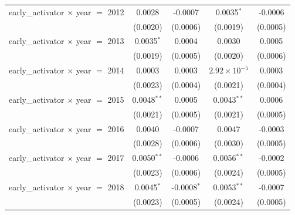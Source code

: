 \begin{tabular}{lcccc}
   early\_activator $\times$ year $=$ 2012              & 0.0028                & -0.0007                   & 0.0035$^{*}$           & -0.0006\\   
                                                        & (0.0020)              & (0.0006)                  & (0.0019)               & (0.0005)\\   
   early\_activator $\times$ year $=$ 2013              & 0.0035$^{*}$          & 0.0004                    & 0.0030                 & 0.0005\\   
                                                        & (0.0019)              & (0.0005)                  & (0.0020)               & (0.0006)\\   
   early\_activator $\times$ year $=$ 2014              & 0.0003                & 0.0003                    & $2.92\times 10^{-5}$   & 0.0003\\   
                                                        & (0.0023)              & (0.0004)                  & (0.0021)               & (0.0004)\\   
   early\_activator $\times$ year $=$ 2015              & 0.0048$^{**}$         & 0.0005                    & 0.0043$^{**}$          & 0.0006\\   
                                                        & (0.0021)              & (0.0005)                  & (0.0021)               & (0.0005)\\   
   early\_activator $\times$ year $=$ 2016              & 0.0040                & -0.0007                   & 0.0047                 & -0.0003\\   
                                                        & (0.0028)              & (0.0006)                  & (0.0030)               & (0.0005)\\   
   early\_activator $\times$ year $=$ 2017              & 0.0050$^{**}$         & -0.0006                   & 0.0056$^{**}$          & -0.0002\\   
                                                        & (0.0023)              & (0.0006)                  & (0.0024)               & (0.0005)\\   
   early\_activator $\times$ year $=$ 2018              & 0.0045$^{*}$          & -0.0008$^{*}$             & 0.0053$^{**}$          & -0.0007\\   
                                                        & (0.0023)              & (0.0005)                  & (0.0024)               & (0.0005)\\   

\end{tabular}

